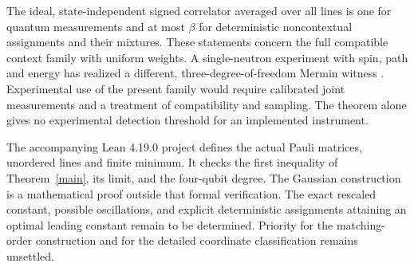 \documentclass[11pt]{article}
\begin{document}
The ideal, state-independent signed correlator averaged over all lines is one for quantum measurements and at most $\beta$ for deterministic noncontextual assignments and their mixtures. These statements concern the full compatible context family with uniform weights. A single-neutron experiment with spin, path and energy has realized a different, three-degree-of-freedom Mermin witness \cite{neutron}. Experimental use of the present family would require calibrated joint measurements and a treatment of compatibility and sampling. The theorem alone gives no experimental detection threshold for an implemented instrument.

The accompanying Lean 4.19.0 project defines the actual Pauli matrices, unordered lines and finite minimum. It checks the first inequality of Theorem~\ref{main}, its limit, and the four-qubit degree. The Gaussian construction is a mathematical proof outside that formal verification. The exact rescaled constant, possible oscillations, and explicit deterministic assignments attaining an optimal leading constant remain to be determined. Priority for the matching-order construction and for the detailed coordinate classification remains unsettled.



\end{document}
